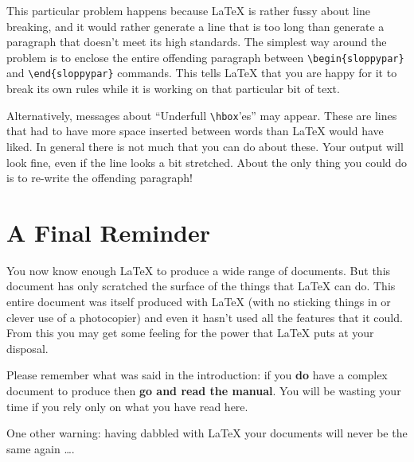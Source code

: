 This particular problem happens because \LaTeX{} is rather fussy about line
breaking, and it would rather generate a line that is too long than generate a
paragraph that doesn't meet its high standards.  The simplest way around the
problem is to enclose the entire offending paragraph between
\verb|\begin{sloppypar}| and \verb|\end{sloppypar}| commands.  This tells
\LaTeX{} that you are happy for it to break its own rules while it is working on
that particular bit of text.

Alternatively, messages about ``Underfull \verb|\hbox|'es'' may appear.
These are lines that had to have more space inserted between
words than \LaTeX{} would have liked.  In general there is not much that you
can do about these.  Your output will look fine, even if the line looks a bit
stretched.  About the only thing you could do is to re-write the offending
paragraph!

\section{A Final Reminder}

You now know enough \LaTeX{} to produce a wide range of documents.  But this
document has only scratched the surface of the
things that \LaTeX{} can do.  This entire document was itself produced with
\LaTeX{} (with no sticking things in or clever use of a photocopier) and even
it hasn't used all the features that it could.  From this you may get some
feeling for the power that \LaTeX{} puts at your disposal.

Please remember what was said in the introduction: if you {\bf do} have a
complex document to produce then {\bf go and read the manual}.  You will be
wasting your time if you rely only on what you have read here.

One other warning: having
dabbled with \LaTeX{} your documents will never be the same again \ldots.


